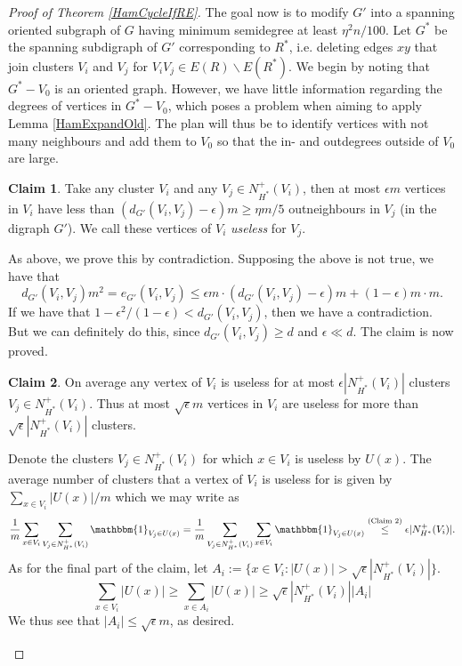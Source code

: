 \documentclass[10pt,letterpaper, reqno]{amsart}
\theoremstyle{definition}
\numberwithin{equation}{section}
\newtheorem{claim}{Claim}
\begin{document}
\begin{proof}[Proof of Theorem \ref{HamCycleIfRE}]
	The goal now is to modify $G'$ into a spanning oriented subgraph of $G$ having minimum semidegree at least $\eta^2n/100$. Let $G^*$ be the spanning subdigraph of $G'$ corresponding to $R^*$, i.e. deleting edges $xy$ that join clusters $V_i$ and $V_j$ for $V_iV_j \in E(R)\backslash E(R^*)$. We begin by noting that $G^*-V_0$ is an oriented graph. However, we have little information regarding the degrees of vertices in $G^*-V_0$, which poses a problem when aiming to apply Lemma \ref{HamExpandOld}. The plan will thus be to identify vertices with not many neighbours and add them to $V_0$ so that the in- and outdegrees outside of $V_0$ are large. 
	 
	\begin{claim}
		Take any cluster $V_i$ and any $V_j \in N_{H^*}^+(V_i)$, then at most $\epsilon m$ vertices in $V_i$ have less than $(d_{G'}(V_i,V_j)-\epsilon)m \geq \eta m /5$ outneighbours in $V_j$ (in the digraph $G'$). We call these vertices of $V_i$ \textit{useless} for $V_j$.
	\end{claim}
	\begin{adjustwidth}{2.5em}{0pt}
			As above, we prove this by contradiction. Supposing the above is not true, we have that
		$$ d_{G'}(V_i,V_j) m^2 = e_{G'}(V_i,V_j) \leq \epsilon m \cdot(d_{G'}(V_i,V_j) - \epsilon) m + (1-\epsilon)m \cdot m.$$ If we have that $1-\epsilon^2/(1-\epsilon) < d_{G'}(V_i,V_j)$, then we have a contradiction. But we can definitely do this, since $d_{G'}(V_i,V_j) \geq d$ and $\epsilon \ll d$. The claim is now proved.
	\end{adjustwidth}
	
	\begin{claim}
		On average any vertex of $V_i$ is useless for at most $\epsilon|N_{H^*}^+(V_i)|$ clusters $V_j \in N_{H^*}^+(V_i)$. Thus at most $\sqrt{\epsilon}m $ vertices in $V_i$ are useless for more than $\sqrt{\epsilon}|N_{H^*}^+(V_i)|$ clusters.
	\end{claim}
	
	\noindent 	\begin{adjustwidth}{2.5em}{0pt}
		Denote the clusters $V_j \in N_{H^*}^+(V_i)$ for which $x \in V_i$ is useless by $U(x)$. The average number of clusters that a vertex of $V_i$ is useless for is given by $\sum_{x\in V_i} |U(x)|/m$ which we may write as
		$$
		 \frac{1}{m} \sum_{x\in V_i} \sum_{V_j \in N_{H^*}^+(V_i)} \mathbbm{1}_{V_j \in U(x)} = \frac{1}{m} \sum_{V_j \in N_{H^*}^+(V_i)} \sum_{x\in V_i} \mathbbm{1}_{V_j \in U(x)} 
		\overset{\text{(Claim 2)}}{\leq} \epsilon |N_{H^*}^+(V_i)|.
		$$
		As for the final part of the claim, let $A_i := \{x \in V_i : |U(x)| > \sqrt{\epsilon}| N_{H^*}^+(V_i)|\}$.
		$$\sum_{x \in V_i} |U(x)| \geq \sum_{x \in A_i} |U(x)| \geq \sqrt{\epsilon}| N_{H^*}^+(V_i)| |A_i| $$
		We thus see that $|A_i| \leq \sqrt{\epsilon}m$, as desired.
	\end{adjustwidth}


\end{proof}
\end{document}
